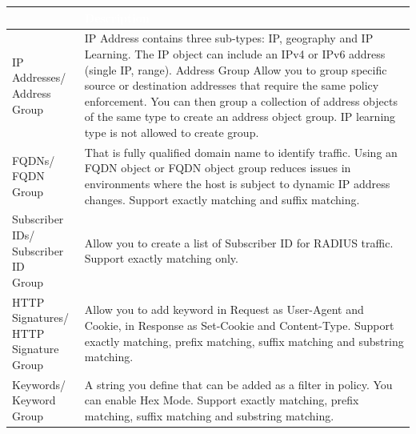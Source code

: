 \begin{longtable}{p{}|p{}}   
    \rowcolor{black}\multicolumn{1}{l!{\vlinewhite}}{\textcolor{white}{Policy Object}}  & \textcolor{white}{Description} \\\hline                                                                                                                                                          
    \tabincell{l}{IP Addresses/\\ Address Group} & IP Address contains three sub-types: IP, geography and IP Learning. The IP object can include an IPv4 or IPv6 address (single IP, range). Address Group Allow you to group specific source or destination addresses that require the same policy enforcement. You can then group a collection of address objects of the same type to create an address object group. IP learning type is not allowed to create group.\\ \hline                                                                                                                                                                                                            
    \tabincell{l}{FQDNs/\\FQDN Group} & That is fully qualified domain name to identify traffic. Using an FQDN object or FQDN object group reduces issues in environments where the host is subject to dynamic IP address changes. Support exactly matching and suffix matching.\\\hline 
    \tabincell{l}{Subscriber IDs/\\Subscriber ID\\ Group} & Allow you to create a list of Subscriber ID for RADIUS traffic. Support exactly matching only. \\\hline 
    \tabincell{l}{HTTP Signatures/\\HTTP Signature\\ Group} & Allow you to add keyword in Request as User-Agent and Cookie, in Response as Set-Cookie and Content-Type. Support exactly matching, prefix matching, suffix matching and substring matching. \\\hline 
    \tabincell{l}{Keywords/\\Keyword Group} &  A string you define that can be added as a filter in policy. You can enable Hex Mode. Support exactly matching, prefix matching, suffix matching and substring matching.
    


\end{longtable}
